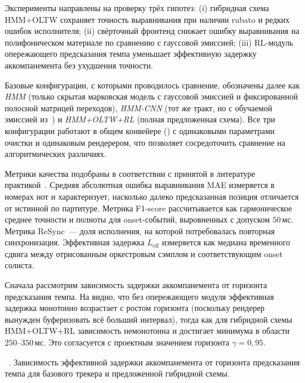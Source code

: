 %
Эксперименты направлены на проверку трёх гипотез: (i) гибридная схема
HMM+OLTW сохраняет точность выравнивания при наличии rubato и редких
ошибок исполнителя; (ii) свёрточный фронтенд снижает ошибку
выравнивания на полифоническом материале по сравнению с гауссовой
эмиссией; (iii) RL-модуль опережающего предсказания темпа уменьшает
эффективную задержку аккомпанемента без ухудшения точности.

Базовые конфигурации, с которыми проводилось сравнение, обозначены
далее как \textit{HMM} (только скрытая марковская модель с гауссовой
эмиссией и фиксированной полосной матрицей переходов), \textit{HMM-CNN}
(тот же тракт, но с обучаемой эмиссией из~) и
\textit{HMM+OLTW+RL} (полная предложенная схема). Все три конфигурации
работают в общем конвейере () с одинаковыми
параметрами очистки и одинаковым рендерером, что позволяет
сосредоточить сравнение на алгоритмических различиях.

Метрики качества подобраны в соответствии с принятой в литературе
практикой~\cite{Nakamura2015,Henkel2025}. Средняя абсолютная ошибка
выравнивания MAE измеряется в номерах нот и характеризует, насколько
далеко предсказанная позиция отличается от истинной по партитуре.
Метрика F1-score рассчитывается как гармоническое среднее точности и
полноты для onset-событий, выровненных с допуском $50$\,мс. Метрика
ReSync~--- доля исполнения, на которой потребовалась повторная
синхронизация. Эффективная задержка $L_{\text{eff}}$ измеряется
как медиана временного сдвига между отрисованным оркестровым сэмплом
и соответствующим onset солиста.

Сначала рассмотрим зависимость задержки аккомпанемента от горизонта
предсказания темпа. На  видно, что без
опережающего модуля эффективная задержка монотонно возрастает с
ростом горизонта (поскольку рендерер вынужден буферизовать всё
больший интервал), тогда как для гибридной схемы HMM+OLTW+RL зависимость
немонотонна и достигает минимума в области $250$--$350$\,мс. Это
согласуется с проектным значением горизонта $\gamma=0{,}95$.

\par\addvspace{2pt}
{\centering
{}%
\resizebox{\columnwidth}{!}{}\par
\vspace{2pt}
\footnotesize
\figurename~\thefigure. Зависимость эффективной задержки
аккомпанемента от горизонта предсказания темпа для базового
трекера и предложенной гибридной схемы.\par}
\addvspace{4pt}

